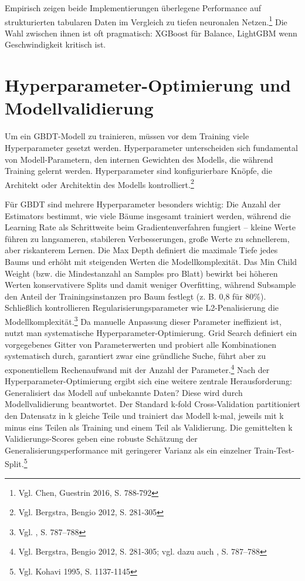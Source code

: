 Empirisch zeigen beide Implementierungen überlegene Performance auf strukturierten tabularen Daten im Vergleich zu tiefen neuronalen Netzen.\footnote{Vgl. Chen, Guestrin 2016, S. 788-792} Die Wahl zwischen ihnen ist oft pragmatisch: XGBoost für Balance, LightGBM wenn Geschwindigkeit kritisch ist.



\section{Hyperparameter-Optimierung und Modellvalidierung}

Um ein GBDT-Modell zu trainieren, müssen vor dem Training viele Hyperparameter gesetzt werden. Hyperparameter unterscheiden sich fundamental von Modell-Parametern, den internen Gewichten des Modells, die während Training gelernt werden. Hyperparameter sind konfigurierbare Knöpfe, die Architekt oder Architektin des Modells kontrolliert.\footnote{Vgl. Bergstra, Bengio 2012, S. 281-305}

Für GBDT sind mehrere Hyperparameter besonders wichtig: Die Anzahl der Estimators bestimmt, wie viele Bäume insgesamt trainiert werden, während die Learning Rate als Schrittweite beim Gradientenverfahren fungiert – kleine Werte führen zu langsameren, stabileren Verbesserungen, große Werte zu schnellerem, aber riskanterem Lernen. Die Max Depth definiert die maximale Tiefe jedes Baums und erhöht mit steigenden Werten die Modellkomplexität. Das Min Child Weight (bzw. die Mindestanzahl an Samples pro Blatt) bewirkt bei höheren Werten konservativere Splits und damit weniger Overfitting, während Subsample den Anteil der Trainingsinstanzen pro Baum festlegt (z. B. 0{,}8 für 80\%). Schließlich kontrollieren Regularisierungsparameter wie L2-Penalisierung die Modellkomplexität.\footnote{Vgl. \cite{Chen2016}, S. 787–788}
Da manuelle Anpassung dieser Parameter ineffizient ist, nutzt man systematische Hyperparameter-Optimierung. Grid Search definiert ein vorgegebenes Gitter von Parameterwerten und probiert alle Kombinationen systematisch durch, garantiert zwar eine gründliche Suche, führt aber zu exponentiellem Rechenaufwand mit der Anzahl der Parameter.\footnote{Vgl. Bergstra, Bengio 2012, S. 281-305; vgl. dazu auch \cite{Chen2016}, S. 787–788}
Nach der Hyperparameter-Optimierung ergibt sich eine weitere zentrale Herausforderung: Generalisiert das Modell auf unbekannte Daten? Diese wird durch Modellvalidierung beantwortet. Der Standard k-fold Cross-Validation partitioniert den Datensatz in k gleiche Teile und trainiert das Modell k-mal, jeweils mit k minus eins Teilen als Training und einem Teil als Validierung. Die gemittelten k Validierungs-Scores geben eine robuste Schätzung der Generalisierungsperformance mit geringerer Varianz als ein einzelner Train-Test-Split.\footnote{Vgl. Kohavi 1995, S. 1137-1145}


